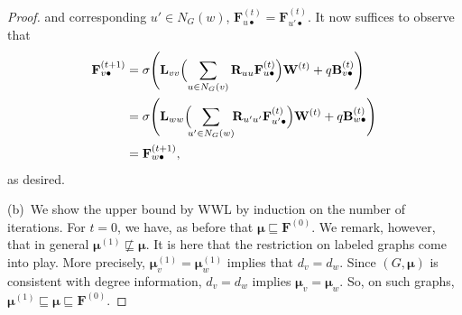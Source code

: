 \begin{proof}
   and corresponding $u'\in N_G(w)$, $\mathbf{F}^{(t)}_{u\bullet}=\mathbf{F}^{(t)}_{u'\bullet}$. It now suffices to observe that
  \begin{align*}
  \mathbf{F}^{(t+1)}_{v\bullet}&=\sigma\Biggl(\mathbf{L}_{vv}\Bigl(\sum_{u\in N_G(v)} \mathbf{R}_{uu}\mathbf{F}^{(t)}_{u\bullet}\Bigr)\mathbf{W}^{(t)}+ q\mathbf{B}^{(t)}_{v\bullet}\Biggr)\\
	 & =\sigma\Biggl(\mathbf{L}_{ww}\Bigl(\!\!\sum_{u'\in N_G(w)}\!\! \mathbf{R}_{u'u'}\mathbf{F}^{(t)}_{u'\bullet}\Bigr)\mathbf{W}^{(t)}+ q\mathbf{B}^{(t)}_{w\bullet}\Biggr)\\
	  &=\mathbf{F}^{(t+1)}_{w\bullet},
\end{align*}
as desired.


(b)~We show the upper bound by WWL by induction on the number of iterations. For $t=0$, we have, as before that $\pmb{\mu}\sqsubseteq \mathbf{F}^{(0)}$. 
We remark, however, that in general $\pmb{\mu}^{(1)}\not\sqsubseteq\pmb{\mu}$.
It is here that the restriction on labeled graphs come into play. More precisely,
$\pmb{\mu}^{(1)}_v=\pmb{\mu}^{(1)}_w$ implies that $d_v=d_w$. Since $(G,\pmb{\mu})$ is consistent with degree information, $d_v=d_w$ implies
$\pmb{\mu}_v=\pmb{\mu}_w$. So, on such graphs, $\pmb{\mu}^{(1)}\sqsubseteq\pmb{\mu}\sqsubseteq\mathbf{F}^{(0)}$.


\end{proof}

